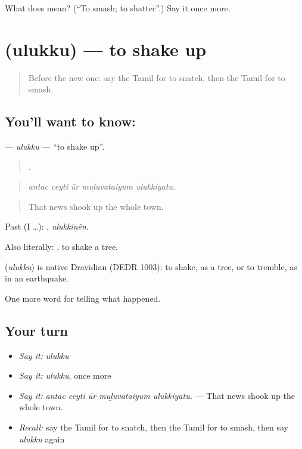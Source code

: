 \begin{tcolorbox}[breakable,colback=teal!4,colframe=teal!35!black,title={Before you move on}]
What does  mean? (\textquotedblleft{}To smash; to shatter\textquotedblright{}.) Say it once more.
\end{tcolorbox}
\section[\texorpdfstring{\ta{உலுக்கு} (ulukku)}{உலுக்கு (ulukku)}]{ (ulukku) — to shake up}

\label{lesson:TA-C304-ulukku}



\begin{quote}
Before the new one: say the Tamil for to snatch, then the Tamil for to smash.
\end{quote}

\subsection*{You'll want to know: }
\textbf{} — \emph{ulukku} — \textquotedblleft{}to shake up\textquotedblright{}.

\begin{quote}
    .
\end{quote}

\begin{quote}
\emph{antac ceyti ūr muḻuvataiyum ulukkiyatu.}
\end{quote}

\begin{quote}
That news shook up the whole town.
\end{quote}

Past (I …): , \emph{ulukkiṉēṉ}.

Also literally:  , to shake a tree.

\begin{cousinweb}
\textbf{} (\emph{ulukku}) is native Dravidian (DEDR 1003): to shake, as a tree, or to tremble, as in an earthquake.
\end{cousinweb}

\begin{grammarlens}[title={What you've built}]
One more word for telling what happened.
\end{grammarlens}

\subsection*{Your turn}
\begin{itemize}
\raggedright
  \item \emph{Say it:} \emph{ulukku}
  \item \emph{Say it:} \emph{ulukku}, once more
  \item \emph{Say it:} \emph{antac ceyti ūr muḻuvataiyum ulukkiyatu.} — That news shook up the whole town.
  \item \emph{Recall:} say the Tamil for to snatch, then the Tamil for to smash, then say \emph{ulukku} again
\end{itemize}

